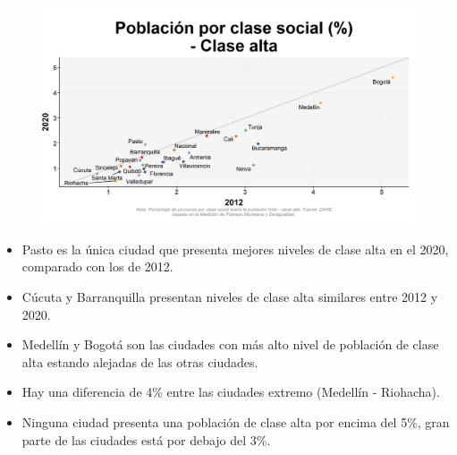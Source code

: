     \begin{figure}[H]
        \caption[Población por clase social - Clase alta (2012 VS 2020) por ciudad ]{\label{clase_alta_ciudades_vs} }
        \begin{center}
        \includegraphics[width=\textwidth,keepaspectratio]{img/var_250_scatter_time.png}
        \end{center}
    \end{figure}
            \begin{itemize}
                    \item Pasto es la única ciudad que presenta mejores niveles de clase alta en el 2020, comparado con los de 2012.
                    \item Cúcuta y Barranquilla presentan niveles de clase alta similares entre 2012 y 2020.
                    \item Medellín y Bogotá son las ciudades con más alto nivel de población de clase alta estando alejadas de las otras ciudades.
                    \item Hay una diferencia de 4\% entre las ciudades extremo (Medellín - Riohacha).
                    \item Ninguna ciudad presenta una población de clase alta por encima del 5\%, gran parte de las ciudades está por debajo del 3\%.
                    \end{itemize}

